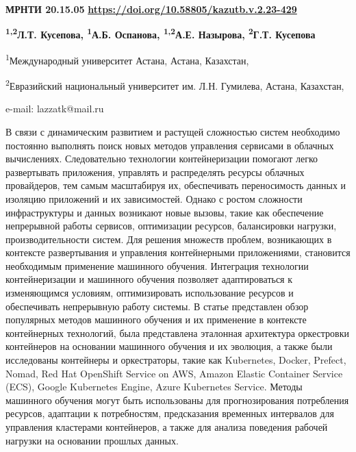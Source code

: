 \newpage
{}
{\bfseries МРНТИ 20.15.05}
\hfill {\bfseries \href{https://doi.org/10.58805/kazutb.v.2.23-429}{https://doi.org/10.58805/kazutb.v.2.23-429}}


\begin{center}
{\bfseries \textsuperscript{1,2}Л.Т. Кусепова\envelope, \textsuperscript{1}А.Б.
Оспанова, \textsuperscript{1,2}А.Е. Назырова, \textsuperscript{2}Г.Т.
Кусепова}

\textsuperscript{1}Международный университет Астана, Астана, Казахстан,

\textsuperscript{2}Евразийский национальный университет им. Л.Н.
Гумилева, Астана, Казахстан,

e-mail: lazzatk@mail.ru
\end{center}

В связи с динамическим развитием и растущей сложностью систем необходимо
постоянно выполнять поиск новых методов управления сервисами в облачных
вычислениях. Следовательно технологии контейнеризации помогают легко
развертывать приложения, управлять и распределять ресурсы облачных
провайдеров, тем самым масштабируя их, обеспечивать переносимость данных
и изоляцию приложений и их зависимостей. Однако с ростом сложности
инфраструктуры и данных возникают новые вызовы, такие как обеспечение
непрерывной работы сервисов, оптимизации ресурсов, балансировки
нагрузки, производительности систем. Для решения множеств проблем,
возникающих в контексте развертывания и управления контейнерными
приложениями, становится необходимым применение машинного обучения.
Интеграция технологии контейнеризации и машинного обучения позволяет
адаптироваться к изменяющимся условиям, оптимизировать использование
ресурсов и обеспечивать непрерывную работу системы. В статье представлен
обзор популярных методов машинного обучения и их применение в контексте
контейнерных технологий, была представлена эталонная архитектура
оркестровки контейнеров на основании машинного обучения и их эволюция, а
также были исследованы контейнеры и оркестраторы, такие как Kubernetes,
Docker, Prefect, Nomad, Red Hat OpenShift Service on AWS, Amazon Elastic
Container Service (ECS), Google Kubernetes Engine, Azure Kubernetes
Service. Методы машинного обучения могут быть использованы для
прогнозирования потребления ресурсов, адаптации к потребностям,
предсказания временных интервалов для управления кластерами контейнеров,
а также для анализа поведения рабочей нагрузки на основании прошлых
данных.

